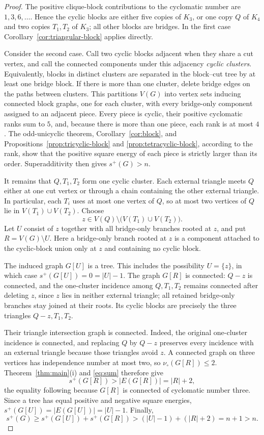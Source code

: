 \documentclass[11pt]{article}
\theoremstyle{definition}
\theoremstyle{remark}
\newcommand{\vp}{\nu_{\circ}}
\begin{document}
\begin{proof}
The positive clique-block contributions to the cyclomatic number are
$1,3,6,\ldots$.  Hence the cyclic blocks are either five copies of $K_3$, or
one copy $Q$ of $K_4$ and two copies $T_1,T_2$ of $K_3$; all other blocks
are bridges.  In the first case Corollary~\ref{cor:triangular-block} applies
directly.

Consider the second case.  Call two cyclic blocks adjacent when they share a
cut vertex, and call the connected components under this adjacency
\emph{cyclic clusters}.  Equivalently, blocks in distinct clusters are
separated in the block--cut tree by at least one bridge block.  If there is
more than one cluster, delete bridge edges on the paths between clusters.
This partitions $V(G)$ into vertex sets inducing connected block graphs,
one for each cluster, with every bridge-only component assigned to an
adjacent piece.  Every piece is cyclic, their positive cyclomatic ranks sum
to $5$, and, because there is more than one piece, each rank is at most
$4$.  The odd-unicyclic theorem, Corollary~\ref{cor:block}, and
Propositions~\ref{prop:tricyclic-block} and
\ref{prop:tetracyclic-block}, according to the rank, show that the positive
square energy of each piece is strictly larger than its order.
Superadditivity then gives $s^+(G)>n$.

It remains that $Q,T_1,T_2$ form one cyclic cluster.  Each external triangle
meets $Q$ either at one cut vertex or through a chain containing the other
external triangle.  In particular, each $T_i$ uses at most one vertex of
$Q$, so at most two vertices of $Q$ lie in $V(T_1)\cup V(T_2)$.  Choose
\[
 z\in V(Q)\setminus\bigl(V(T_1)\cup V(T_2)\bigr).
\]
Let $U$ consist of $z$ together with all bridge-only branches rooted at $z$,
and put $R=V(G)\setminus U$.  Here a bridge-only branch rooted at $z$ is a
component attached to the cyclic-block union only at $z$ and containing no
cyclic block.

The induced graph $G[U]$ is a tree.  This includes the possibility
$U=\{z\}$, in which case $s^+(G[U])=0=|U|-1$.  The graph $G[R]$ is connected:
$Q-z$ is connected, and the one-cluster incidence among $Q,T_1,T_2$ remains
connected after deleting $z$, since $z$ lies in neither external triangle;
all retained bridge-only branches stay joined at their roots.  Its cyclic
blocks are precisely the three triangles $Q-z,T_1,T_2$.

Their triangle intersection graph is connected.  Indeed, the original
one-cluster incidence is connected, and replacing $Q$ by $Q-z$ preserves
every incidence with an external triangle because those triangles avoid
$z$.  A connected graph on three vertices has independence number at most
two, so $\vp(G[R])\le2$.  Theorem~\ref{thm:main}(i) and
\eqref{eq:sum} therefore give
\[
 s^+(G[R])>|E(G[R])|=|R|+2,
\]
the equality following because $G[R]$ is connected of cyclomatic number
three.  Since a tree has equal positive and negative square energies,
$s^+(G[U])=|E(G[U])|=|U|-1$.  Finally,
\[
 s^+(G)\ge s^+(G[U])+s^+(G[R])
 >(|U|-1)+(|R|+2)=n+1>n.
\]
\end{proof}
\end{document}
